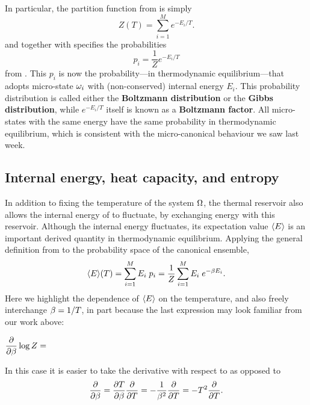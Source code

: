 In particular, the partition function from  is simply
\begin{equation}
  \label{eq:canon_part_func}
  Z(T) = \sum_{i = 1}^M e^{-E_i / T}.
\end{equation}
and together with \be specifies the probabilities
\begin{equation}
  \label{eq:canon_prob}
  p_i = \frac{1}{Z} e^{-E_i / T}
\end{equation}
from .
This $p_i$ is now the probability---in thermodynamic equilibrium---that \Om adopts micro-state $\omega_i$ with (non-conserved) internal energy $E_i$.
This probability distribution is called either the \textbf{Boltzmann distribution} or the \textbf{Gibbs distribution}, while $e^{-E_i / T}$ itself is known as a \textbf{Boltzmann factor}.
All micro-states with the same energy have the same probability in thermodynamic equilibrium, which is consistent with the micro-canonical behaviour we saw last week.



\subsection{\label{sec:canon_derived}Internal energy, heat capacity, and entropy}
In addition to fixing the temperature of the system $\Omega$, the thermal reservoir also allows the internal energy of \Om to fluctuate, by exchanging energy with this reservoir.
Although the internal energy fluctuates, its expectation value $\left\langle E \right\rangle$ is an important derived quantity in thermodynamic equilibrium.
Applying the general definition from  to the probability space of the canonical ensemble,
\begin{equation*}
  \left\langle E \right\rangle\!(T) = \sum_{i = 1}^M E_i \; p_i = \frac{1}{Z} \sum_{i = 1}^M E_i \; e^{-\beta E_i}.
\end{equation*}
\newpage %
\noindent
Here we highlight the dependence of $\left\langle E \right\rangle$ on the temperature, and also freely interchange $\beta = 1 / T$, in part because the last expression may look familiar from our work above:
\begin{mdframed}
  $\displaystyle \frac{\partial }{\partial \beta} \log Z = $ \\[100 pt]
\end{mdframed}
In this case it is easier to take the derivative with respect to \be as opposed to
\begin{equation}
  \label{eq:beta_T}
  \frac{\partial }{\partial \beta} = \frac{\partial T}{\partial \beta} \frac{\partial }{\partial T} = -\frac{1}{\beta^2} \frac{\partial }{\partial T} = -T^2 \frac{\partial }{\partial T}.
\end{equation}


